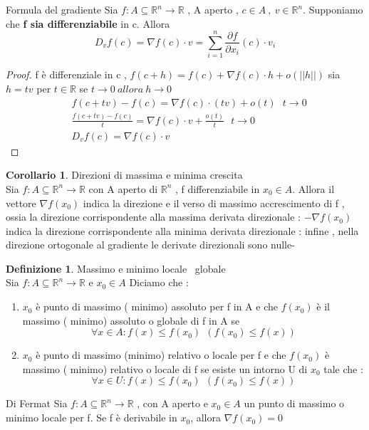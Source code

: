 \documentclass{article}
\theoremstyle{definition}
\newtheorem*{definizione}{Definizione}
\newtheorem*{corollario}{Corollario}
\newcommand{\R}{\mathbb{R}}
\newcommand{\Rn}{\R^n}
\newcommand{\fn}{f: A\subseteq \Rn \rightarrow \R}
\begin{document}
	\begin{teo}{Formula del gradiente}{}
		Sia $\fn$ , A aperto , $c \in A \ , \ v \in \Rn $. Supponiamo che \textbf{f sia differenziabile} in c. Allora $$D_vf(c)=\nabla f(c) \cdot v=\sum_{i=1}^n \frac{\partial f}{\partial x_i}(c) \cdot v_i$$
	\end{teo}
	\begin{proof}
		f è differenziale in c , $f(c+h)=f(c)+\nabla f(c) \cdot h+o(||h||)$ sia $h=tv$ per $t \in \R$ se $t \rightarrow 0 \ allora \ h \rightarrow 0$ \\
		\begin{align*}
			&f(c+tv)-f(c)=\nabla f(c) \cdot (tv)+o(t) \ \ \ t  \rightarrow 0 \\
			&\frac{f(c+tv)-f(c)}{t}=\nabla f(c) \cdot v+\frac{o(t)}{t} \ \ \ t  \rightarrow 0 \\
			&D_vf(c)=\nabla f(c) \cdot v 
		\end{align*}
	\end{proof}
	\begin{corollario}
		Direzioni di massima e minima crescita \\
		Sia $\fn$ con A aperto di $\Rn$ , f differenziabile in $x_0\in A$. Allora il vettore $\nabla f(x_0)$ indica la direzione e il verso di massimo accrescimento di f , ossia la direzione corrispondente alla massima derivata direzionale : $-\nabla f(x_0)$ indica la direzione corrispondente alla minima derivata direzionale : infine , nella direzione ortogonale al gradiente le derivate direzionali sono nulle- 
	\end{corollario}
	\begin{definizione}
		Massimo e minimo locale \ globale \\
		Sia $\fn$ e $x_0 \in A$ Diciamo che : 
		\begin{enumerate}
			\item $x_0$ è punto di massimo ( minimo) assoluto per f in A e che $f(x_0)$ è il massimo ( minimo) assoluto o globale di f in A se $$\forall x \in A : f(x) \leq f(x_0)\ \  ( f(x_0) \leq f(x))$$
			\item $x_0$ è punto di massimo  (minimo) relativo o locale per f e che $f(x_0)$ è massimo ( minimo) relativo o locale di f se esiste un intorno U di $x_0$ tale che : $$ \forall x \in U : f(x) \leq f(x_0) \ \  (f(x_0) \leq f(x))$$ 
		\end{enumerate}
	\end{definizione}
	\begin{teo} {	Di Fermat }{}
		Sia $\fn$ , con A aperto e $x_0 \in A$ un punto di massimo o minimo locale per f. Se f è derivabile in $x_0$, allora $\nabla f(x_0)=0$ 
	\end{teo}
\end{document}
